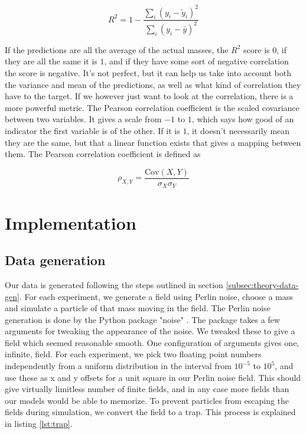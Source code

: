\documentclass[a4paper]{article}
\begin{document}
\begin{equation*}
    R^2 = 1 - \frac{\sum_i (y_i - \tilde{y}_i)^2}{\sum_i (y_i - \bar{y})^2}
\end{equation*}

If the predictions are all the average of the actual masses, the $R^2$ score is $0$, if they are all the same it is $1$, and if they have some sort of negative correlation the score is negative. It's not perfect, but it can help us take into account both the variance and mean of the predictions, as well as what kind of correlation they have to the target. If we however just want to look at the correlation, there is a more powerful metric. The Pearson correlation coefficient is the scaled covariance between two variables. It gives a scale from $-1$ to $1$, which says how good of an indicator the first variable is of the other. If it is $1$, it doesn't necessarily mean they are the same, but that a linear function exists that gives a mapping between them. The Pearson correlation coefficient is defined as

\begin{equation*}
    \rho_{X,Y} = \frac{\mathrm{Cov}{(X,Y)}}{\sigma_X \sigma_Y}
\end{equation*}

\section{Implementation}

\subsection{Data generation}
Our data is generated following the steps outlined in section \ref{subsec:theory-data-gen}. For each experiment, we generate a field using Perlin noise, choose a mass and simulate a particle of that mass moving in the field. The Perlin noise generation is done by the Python package "noise" \cite{pypi-noise}. The package takes a few arguments for tweaking the appearance of the noise. We tweaked these to give a field which seemed reasonable smooth. One configuration of arguments gives one, infinite, field. For each experiment, we pick two floating point numbers independently from a uniform distribution in the interval from $10^{-5}$ to $10^{5}$, and use these as x and y offsets for a unit square in our Perlin noise field. This should give virtually limitless number of finite fields, and in any case more fields than our models would be able to memorize. To prevent particles from escaping the fields during simulation, we convert the field to a trap. This process is explained in listing \ref{lst:trap}.
\end{document}

